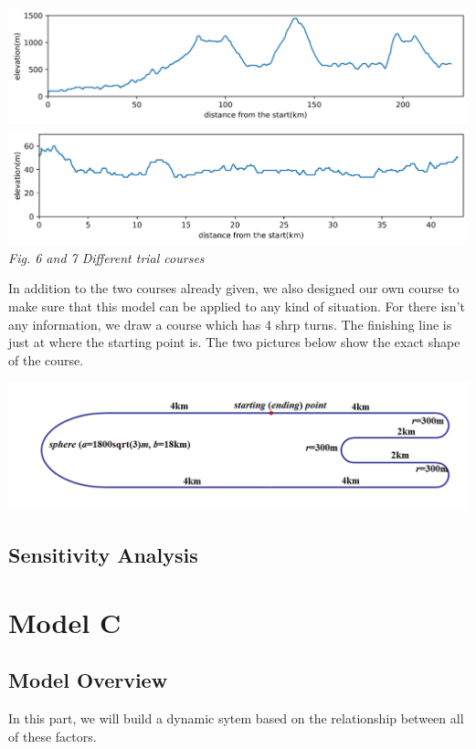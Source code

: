 \documentclass{article}
\begin{document}
	\begin{center}
		\includegraphics[width=15cm]{6.png}\\
		\includegraphics[width=15cm]{7.png}\\
		\small \textit{Fig. 6 and 7  Different trial courses}
	\end{center}
	In addition to the two courses already given, we also designed our own course to make sure that this model can be applied to any kind of situation. For there isn't any information, we draw a course which has 4 shrp turns. The finishing line is just at where the starting point is. The two pictures below show the exact shape of the course.

	\begin{center}
		\includegraphics*[width=15cm]{8.png}
	\end{center}
	\subsection{Sensitivity Analysis}
	\section{Model C}
	\subsection{Model Overview}
	In this part, we will build a dynamic sytem based on the relationship between all of these factors.
\end{document}
